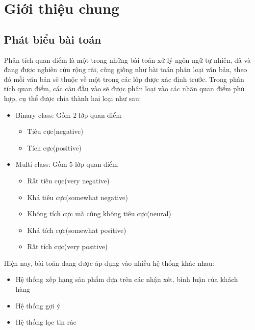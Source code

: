 
\chapter{Giới thiệu chung}
\ifpdf
    \graphicspath{{Chapter1/Chapter1Figs/PNG/}{Chapter1/Chapter1Figs/PDF/}{Chapter1/Chapter1Figs/}}
\else
    \graphicspath{{Chapter1/Chapter1Figs/EPS/}{Chapter1/Chapter1Figs/}}
\fi

\section{Phát biểu bài toán}
	Phân tích quan điểm là một trong những bài toán xử lý ngôn ngữ tự nhiên, đã và đang được nghiên cứu rộng rãi, cũng giống như bài toán phân loại văn bản, theo đó mỗi văn bản sẽ thuộc về một trong các lớp được xác định trước. Trong phân tích quan điểm, các câu đầu vào sẽ được phân loại vào các nhãn quan điểm phù hợp, cụ thể được chia thành hai loại như sau: \\
	\begin{itemize}[label = \textbullet]
		\item Binary class: Gồm 2 lớp quan điểm
		\begin{itemize}[label = \textendash]
			\item Tiêu cực(negative)
			\item Tích cực(positive)
		\end{itemize}
		\item Multi class: Gồm 5 lớp quan điểm
		\begin{itemize}[label = \textendash]
			\item Rất tiêu cực(very negative)
			\item Khá tiêu cực(somewhat negative)
			\item Không tích cực mà cũng không tiêu cực(neural)
			\item Khá tích cực(somewhat positive)
			\item Rất tích cực(very positive) \\
		\end{itemize}
	\end{itemize} 
Hiện nay, bài toán đang được áp dụng vào nhiều hệ thống khác nhau:
	\begin{itemize}[label = \textbullet]
		\item Hệ thống xếp hạng sản phẩm dựa trên các nhận xét, bình luận của khách hàng
		\item Hệ thống gợi ý
		\item Hệ thống lọc tin rác 
	\end{itemize}

